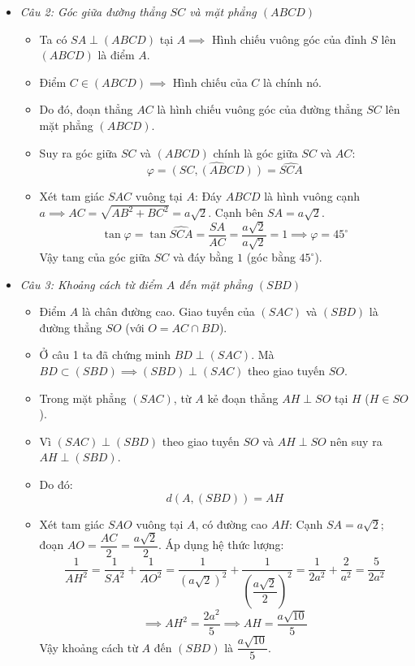 \documentclass[12pt, a4paper]{article}
\begin{document}
\begin{itemize}[leftmargin=1.2cm]
\begin{itemize}[leftmargin=0.6cm]
        \item \textit{Câu 2: Góc giữa đường thẳng $SC$ và mặt phẳng $(ABCD)$}
        \begin{itemize}
            \item Ta có $SA \perp (ABCD)$ tại $A \implies$ Hình chiếu vuông góc của đỉnh $S$ lên $(ABCD)$ là điểm $A$.
            \item Điểm $C \in (ABCD) \implies$ Hình chiếu của $C$ là chính nó.
            \item Do đó, đoạn thẳng $AC$ là hình chiếu vuông góc của đường thẳng $SC$ lên mặt phẳng $(ABCD)$.
            \item Suy ra góc giữa $SC$ và $(ABCD)$ chính là góc giữa $SC$ và $AC$:
            $$\varphi = \widehat{(SC, (ABCD))} = \widehat{SCA}$$
            \item Xét tam giác $SAC$ vuông tại $A$:
            Đáy $ABCD$ là hình vuông cạnh $a \implies AC = \sqrt{AB^2 + BC^2} = a\sqrt{2}$.
            Cạnh bên $SA = a\sqrt{2}$.
            $$\tan \varphi = \tan \widehat{SCA} = \dfrac{SA}{AC} = \dfrac{a\sqrt{2}}{a\sqrt{2}} = 1 \implies \varphi = 45^\circ$$
            Vậy tang của góc giữa $SC$ và đáy bằng $1$ (góc bằng $45^\circ$).
        \end{itemize}

        \item \textit{Câu 3: Khoảng cách từ điểm $A$ đến mặt phẳng $(SBD)$}
        \begin{itemize}
            \item Điểm $A$ là chân đường cao. Giao tuyến của $(SAC)$ và $(SBD)$ là đường thẳng $SO$ (với $O = AC \cap BD$).
            \item Ở câu 1 ta đã chứng minh $BD \perp (SAC)$. Mà $BD \subset (SBD) \implies (SBD) \perp (SAC)$ theo giao tuyến $SO$.
            \item Trong mặt phẳng $(SAC)$, từ $A$ kẻ đoạn thẳng $AH \perp SO$ tại $H$ ($H \in SO$).
            \item Vì $(SAC) \perp (SBD)$ theo giao tuyến $SO$ và $AH \perp SO$ nên suy ra $AH \perp (SBD)$.
            \item Do đó:
            $$d(A, (SBD)) = AH$$
            \item Xét tam giác $SAO$ vuông tại $A$, có đường cao $AH$:
            Cạnh $SA = a\sqrt{2}$; đoạn $AO = \dfrac{AC}{2} = \dfrac{a\sqrt{2}}{2}$.
            Áp dụng hệ thức lượng:
            $$\dfrac{1}{AH^2} = \dfrac{1}{SA^2} + \dfrac{1}{AO^2} = \dfrac{1}{(a\sqrt{2})^2} + \dfrac{1}{\left(\dfrac{a\sqrt{2}}{2}\right)^2} = \dfrac{1}{2a^2} + \dfrac{2}{a^2} = \dfrac{5}{2a^2}$$
            $$\implies AH^2 = \dfrac{2a^2}{5} \implies AH = \dfrac{a\sqrt{10}}{5}$$
            Vậy khoảng cách từ $A$ đến $(SBD)$ là $\dfrac{a\sqrt{10}}{5}$.
        \end{itemize}


\end{itemize}
\end{itemize}
\end{document}
